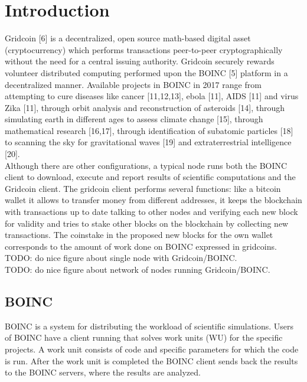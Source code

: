 \section{Introduction}
\label{sec:intro}

Gridcoin [6] is a decentralized, open source math-based digital asset (cryptocurrency) which performs transactions peer-to-peer cryptographically without the need for a central issuing authority. Gridcoin securely rewards volunteer distributed computing performed upon the BOINC [5] platform in a decentralized manner. Available projects in BOINC in 2017 range from attempting to cure diseases like cancer [11,12,13], ebola [11], AIDS [11] and virus Zika [11], through orbit analysis and reconstruction of asteroids [14], through simulating earth in different ages to assess climate change [15], through mathematical research [16,17], through identification of subatomic particles [18] to scanning the sky for gravitational waves [19] and extraterrestrial intelligence [20].\\

Although there are other configurations, a typical node runs both the BOINC client to download, execute and report results of scientific computations and the Gridcoin client. The gridcoin client performs several functions: like a bitcoin wallet it allows to transfer money from different addresses, it keeps the blockchain with transactions up to date talking to other nodes and verifying each new block for validity and tries to stake other blocks on the blockchain by collecting new transactions. The coinstake in the proposed new blocks for the own wallet corresponds to the amount of work done on BOINC expressed in gridcoins.\\

TODO: do nice figure about single node with Gridcoin/BOINC.\\
TODO: do nice figure about network of nodes running Gridcoin/BOINC.\\

\subsection{BOINC}

BOINC is a system for distributing the workload of scientific simulations. Users of BOINC have a client running that solves work units (WU) for the specific projects. A work unit consists of code and specific parameters for which the code is run.  After the work unit is completed the BOINC client sends back the results to the BOINC servers, where the results are analyzed.\\

